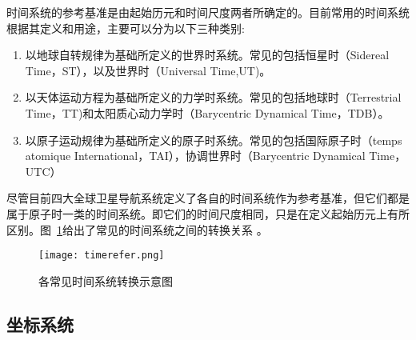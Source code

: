 时间系统的参考基准是由起始历元和时间尺度两者所确定的。目前常用的时间系统根据其定义和用途，主要可以分为以下三种类别:
\begin{enumerate}
    \item 以地球自转规律为基础所定义的世界时系统。常见的包括恒星时（Sidereal Time，ST），以及世界时（Universal Time,UT)。
    \item 以天体运动方程为基础所定义的力学时系统。常见的包括地球时（Terrestrial Time，TT)和太阳质心动力学时（Barycentric Dynamical Time，TDB）。
    \item 以原子运动规律为基础所定义的原子时系统。常见的包括国际原子时（temps atomique International，TAI），协调世界时（Barycentric Dynamical Time，UTC）
\end{enumerate}

尽管目前四大全球卫星导航系统定义了各自的时间系统作为参考基准，但它们都是属于原子时一类的时间系统。即它们的时间尺度相同，只是在定义起始历元上有所区别。图~\ref{fig:timerefer}给出了常见的时间系统之间的转换关系 。
\begin{figure}
  \centering
  \texttt{[image: timerefer.png]}
  \caption{各常见时间系统转换示意图}
  \label{fig:timerefer}
\end{figure}

\subsection{坐标系统}

